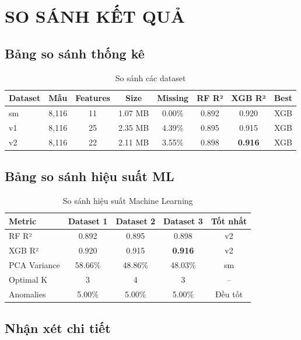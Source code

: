 \documentclass[12pt,a4paper]{article}
\begin{document}
\section{SO SÁNH KẾT QUẢ}

\subsection{Bảng so sánh thống kê}

\begin{table}[H]
\centering
\small
\begin{tabular}{lccccccc}
\toprule
\textbf{Dataset} & \textbf{Mẫu} & \textbf{Features} & \textbf{Size} & \textbf{Missing} & \textbf{RF R²} & \textbf{XGB R²} & \textbf{Best}\\
\midrule
sm & 8,116 & 11 & 1.07 MB & 0.00\% & 0.892 & 0.920 & XGB\\
v1 & 8,116 & 25 & 2.35 MB & 4.39\% & 0.895 & 0.915 & XGB\\
v2 & 8,116 & 22 & 2.11 MB & 3.55\% & 0.898 & \textbf{0.916} & XGB\\
\bottomrule
\end{tabular}
\caption{So sánh các dataset}
\end{table}

\subsection{Bảng so sánh hiệu suất ML}

\begin{table}[H]
\centering
\begin{tabular}{lcccc}
\toprule
\textbf{Metric} & \textbf{Dataset 1} & \textbf{Dataset 2} & \textbf{Dataset 3} & \textbf{Tốt nhất}\\
\midrule
RF R² & 0.892 & 0.895 & 0.898 & v2\\
XGB R² & 0.920 & 0.915 & \textbf{0.916} & v2\\
PCA Variance & 58.66\% & 48.86\% & 48.03\% & sm\\
Optimal K & 3 & 4 & 3 & --\\
Anomalies & 5.00\% & 5.00\% & 5.00\% & Đều tốt\\
\bottomrule
\end{tabular}
\caption{So sánh hiệu suất Machine Learning}
\end{table}

\subsection{Nhận xét chi tiết}
\end{document}
